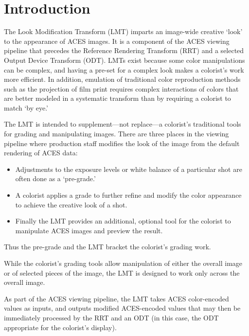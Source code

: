 \unnumberedformat	    %
\chapter{Introduction} 	%

The Look Modification Transform (LMT) imparts an image-wide creative `look' to the appearance of ACES images. It is a component of the ACES viewing pipeline that precedes the Reference Rendering Transform (RRT) and a selected Output Device Transform (ODT). LMTs exist because some color manipulations can be complex, and having a pre-set for a complex look makes a colorist's work more efficient. In addition, emulation of traditional color reproduction methods such as the projection of film print requires complex interactions of colors that are better modeled in a systematic transform than by requiring a colorist to match `by eye.'

The LMT is intended to supplement—not replace—a colorist's traditional tools for grading and manipulating images. There are three places in the viewing pipeline where production staff modifies the look of the image from the default rendering of ACES data:  

\begin{itemize}
    \item   Adjustments to the exposure levels or white balance of a particular shot are often done as a `pre-grade.'
    \item   A colorist applies a grade to further refine and modify the color appearance to achieve the creative look of a shot. 
    \item   Finally the LMT provides an additional, optional tool for the colorist to manipulate ACES images and preview the result.
\end{itemize}

Thus the pre-grade and the LMT bracket the colorist's grading work.

While the colorist's grading tools allow manipulation of either the overall image or of selected pieces of the image, the LMT is designed to work only across the overall image. 

As part of the ACES viewing pipeline, the LMT takes ACES color-encoded values as inputs, and outputs modified ACES-encoded values that may then be immediately processed by the RRT and an ODT (in this case, the ODT appropriate for the colorist’s display).

